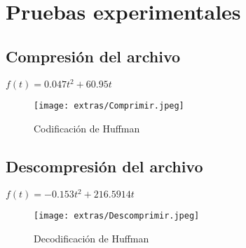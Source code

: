 \documentclass[12 pt]{report}
\begin{document}
\newpage
\section{Pruebas experimentales}
\subsection{Compresión del archivo}
$f(t) = 0.047t^2+60.95t$\\
\begin{figure}[h!]
  \centering
  \texttt{[image: extras/Comprimir.jpeg]}
  \caption{Codificación de Huffman}
\end{figure}
\newpage
\subsection{Descompresión del archivo}
$f(t) = -0.153t^2+216.5914t$\\
\begin{figure}[ht]
  \centering
  \texttt{[image: extras/Descomprimir.jpeg]}
  \caption{Decodificación de Huffman}
\end{figure}
\newpage
\end{document}
